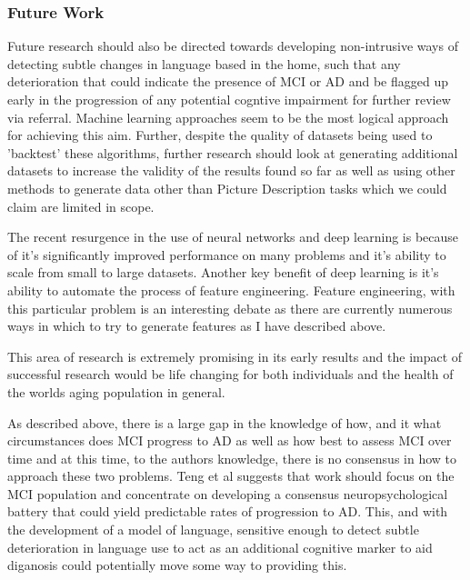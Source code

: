 \documentclass[12pt, twoside, a4paper]{article}
\begin{document}
\subsubsection{Future Work}
Future research should also be directed towards developing non-intrusive ways of detecting subtle changes in language based in the home, such that any deterioration that could indicate the presence of MCI or AD and be flagged up early in the progression of any potential cogntive impairment for further review via referral. Machine learning approaches seem to be the most logical approach for achieving this aim. Further, despite the quality of datasets being used to 'backtest' these algorithms, further research should look at generating additional datasets to increase the validity of the results found so far as well as using other methods to generate data other than Picture Description tasks which we could claim are limited in scope.
\par
The recent resurgence in the use of neural networks and deep learning is because of it's significantly improved performance on many problems and it's ability to scale from small to large datasets. Another key benefit of deep learning is it's ability to automate the process of feature engineering. Feature engineering, with this particular problem is an interesting debate as there are currently numerous ways in which to try to generate features as I have described above.
\par
This area of research is extremely promising in its early results and the impact of successful research would be life changing for both individuals and the health of the worlds aging population in general.
\par 
As described above, there is a large gap in the knowledge of how, and it what circumstances does MCI progress to AD as well as how best to assess MCI over time and at this time, to the authors knowledge, there is no consensus in how to approach these two problems. Teng et al suggests that work should focus on the MCI population and concentrate on developing a consensus neuropsychological battery that could yield predictable rates of progression to AD. This, and with the development of a model of language, sensitive enough to detect subtle deterioration in language use to act as an additional cognitive marker to aid diganosis could potentially move some way to providing this.
\par 
\end{document}
